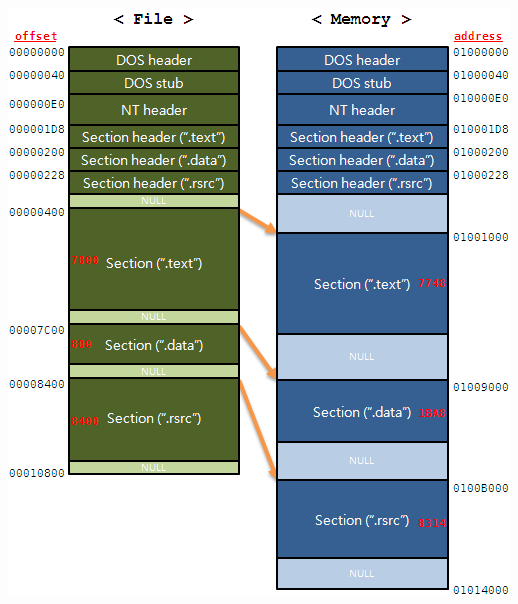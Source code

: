 \documentclass{beamer}
\begin{document}
\begin{frame}[plain]
\begin{center}
\includegraphics[scale=0.4]{pe_sections.png}
\end{center}
\end{frame}
\end{document}
